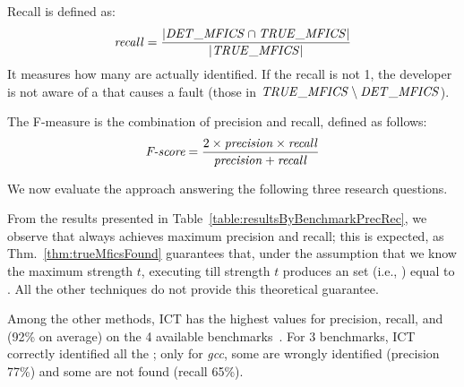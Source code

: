 \begin{tikzborder}{\cite{Gargantini16:validation}}
\begin{tikzborder}{\cite{gargantini_combinatorial_2017}}
\begin{tikzborder}{\cite{garn2019}}
\begin{tikzborder}{\cite{arcaini2019achieving}}
\begin{tikzborder}{}
Recall is defined as:
%
\[\mathit{recall} = \frac{|\mathit{DET\_MFICS} \cap \mathit{TRUE\_MFICS}|}{|\mathit{TRUE\_MFICS}|}\]
%
It measures how many \truemfics are actually identified. If the recall is not 1, the developer is not aware of a \truemfic that causes a fault (those in $\mathit{TRUE\_MFICS} \setminus \mathit{DET\_MFICS}$).

The F-measure is the combination of precision and recall, defined as follows:
%
\[\textnormal{\it F-score} = \frac{2 \times \mathit{precision} \times \mathit{recall}}{\mathit{precision} + \mathit{recall}}\]

We now evaluate the approach answering the following three research questions.


From the results presented in Table~\ref{table:resultsByBenchmarkPrecRec}, we observe that \mix always achieves maximum precision and recall; this is expected, as Thm.~\ref{thm:trueMficsFound} guarantees that, under the assumption that we know the maximum strength $t$, executing \mix till strength $t$ produces an \isoMficsSet set (i.e., \detMficsSet) equal to \trueMficsSet. All the other techniques do not provide this theoretical guarantee.

Among the other methods, ICT has the highest values for precision, recall, and \fScore (92\% on average) on the 4 available benchmarks~\cite{Niu2018interleaving}. For 3 benchmarks, ICT correctly identified all the \trueMficsSet; only for \textit{gcc}, some are wrongly identified (precision 77\%) and some are not found (recall 65\%).


\end{tikzborder}
\end{tikzborder}
\end{tikzborder}
\end{tikzborder}
\end{tikzborder}
